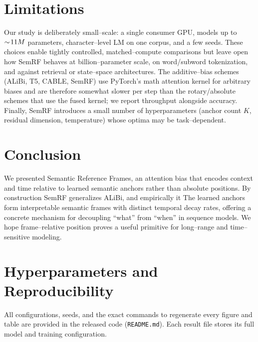 \documentclass[11pt]{article}
\begin{document}
\section{Limitations}
\label{sec:limits}

Our study is deliberately small--scale: a single consumer GPU, models up to
$\sim\!11M{}$ parameters, character--level LM on one corpus, and a
few seeds. These choices enable tightly controlled, matched--compute comparisons
but leave open how SemRF behaves at billion--parameter scale, on word/subword
tokenization, and against retrieval or state--space architectures. The
additive--bias schemes (ALiBi, T5, CABLE, SemRF) use PyTorch's math attention kernel
for arbitrary biases and are therefore somewhat slower per step than the
rotary/absolute schemes that use the fused kernel; we report throughput
alongside accuracy. Finally, SemRF introduces a small number of hyperparameters
(anchor count $K$, residual dimension, temperature) whose optima may be
task--dependent.

\section{Conclusion}
\label{sec:conclusion}

We presented Semantic Reference Frames, an attention bias that encodes context
and time relative to learned semantic anchors rather than absolute positions. By
construction SemRF generalizes ALiBi, and empirically it \resConclusionClaim{}
The learned anchors form interpretable semantic frames with distinct temporal
decay rates, offering a concrete mechanism for decoupling ``what'' from ``when''
in sequence models. We hope frame--relative position proves a useful primitive
for long--range and time--sensitive modeling.

\clearpage



\appendix
\section{Hyperparameters and Reproducibility}
\label{app:hparams}
\resAppendixProse{}
All configurations, seeds, and the exact commands to regenerate every figure and
table are provided in the released code (\texttt{README.md}). Each result file
stores its full model and training configuration.
\end{document}
